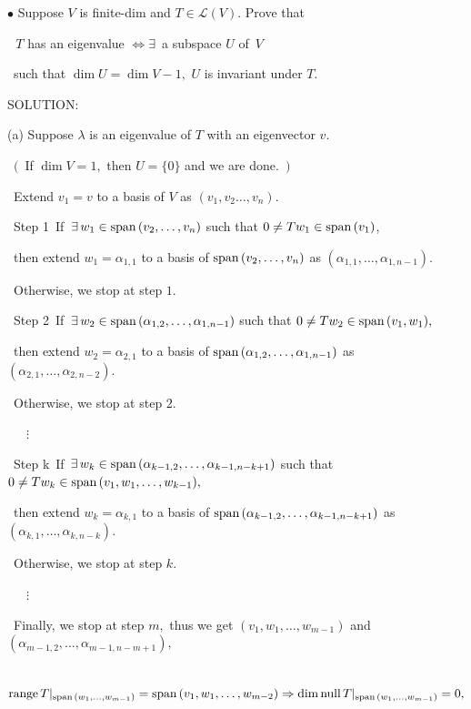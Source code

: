 \documentclass[a4paper, 11pt, UTF8]{article}
\def\range{\textup{range}\,}
\def\null{\textup{null\,}}
\def\Spn{\textup{span}\,}
\def\Lm{\mathcal{L}}
\begin{document}
\begin{large}
{\small $\bullet$} {\timessl\Large 
Suppose $V$ is finite-dim and $T\in\Lm(V)$. Prove that
}\par\,\,
{\timessl\Large $T$ has an eigenvalue $\Longleftrightarrow\exists\,$ a subspace $U$ of \,$V$}\par\qquad\qquad\qquad\qquad\qquad\qquad\qquad\,
{\timessl\Large such that $\dim U=\dim V - 1,$ $U$ is invariant under $T$.
}\par
{\timesbf S\footnotesize{OLUTION:}}\par\quad
(a) Suppose $\lambda$ is an eigenvalue of $T$ with an eigenvector $v.$\par\qquad\,
$(\,$ If $\dim V=1,$ then $U=\{0\}$ and we are done. $\,)$\par\qquad\,
Extend $v_1=v$ to a basis of $V$ as $(v_1,v_2\dots,v_n).$\par\qquad\,
{\timesbf Step 1} $\,$If $\,\exists\,w_1\in\Spn(v_2,\dots,v_n)$ such that $0\neq Tw_1\in\Spn(v_1)$,\par\qquad\qquad\quad\,
then extend $w_1=\alpha_{1,1}$ to a basis of $\Spn(v_2,\dots,v_n)$ as $(\alpha_{1,1},\dots,\alpha_{1,n-1}).$\par\qquad\qquad\quad\, Otherwise, we stop at step $1.$\par\qquad\,
{\timesbf Step 2} $\,$If $\,\exists\,w_2\in\Spn(\alpha_{1,2},\dots,\alpha_{1,n-1})$ such that $0\neq Tw_2\in\Spn(v_1,w_1),$\par\qquad\qquad\quad\,
then extend $w_2=\alpha_{2,1}$ to a basis of $\Spn(\alpha_{1,2},\dots,\alpha_{1,n-1})$ as $(\alpha_{2,1},\dots,\alpha_{2,n-2}).$\par\qquad\qquad\quad\, Otherwise, we stop at step $2.$\par\qquad\,
$\quad\vdots$\par\qquad\,
{\timesbf Step k} $\,$If $\,\exists\,w_k\in\Spn(\alpha_{k-1,2},\dots,\alpha_{k-1,n-k+1})$ such that $0\neq Tw_k\in\Spn(v_1,w_1,\dots,w_{k-1}),$\par\qquad\qquad\quad\,
then extend $w_k=\alpha_{k,1}$ to a basis of $\Spn(\alpha_{k-1,2},\dots,\alpha_{k-1,n-k+1})$ as $(\alpha_{k,1},\dots,\alpha_{k,n-k}).$\par\qquad\qquad\quad\,
Otherwise, we stop at step $k.$\par\qquad\,
$\quad\vdots$\par\qquad\,
Finally, we stop at step $m,$ thus we get $(v_1,w_1,\dots,w_{m-1})$ and $(\alpha_{m-1,2},\dots,\alpha_{m-1,n-m+1}),$\par\qquad\,
$\range T|_{\Spn(w_1,\dots,w_{m-1})}=\Spn(v_1,w_1,\dots,w_{m-2})\Rightarrow\dim\null T|_{\Spn(w_1,\dots,w_{m-1})}=0,$\par\qquad\,

\end{large}
\end{document}
